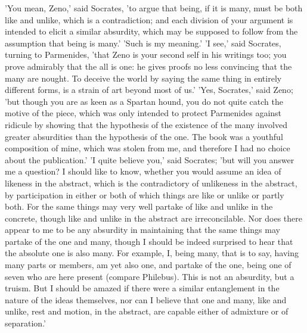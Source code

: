 'You mean, Zeno,' said Socrates, 'to argue that being, if it is many,
must be both like and unlike, which is a contradiction; and each
division of your argument is intended to elicit a similar absurdity,
which may be supposed to follow from the assumption that being is many.'
'Such is my meaning.' 'I see,' said Socrates, turning to Parmenides,
'that Zeno is your second self in his writings too; you prove admirably
that the all is one: he gives proofs no less convincing that the many
are nought. To deceive the world by saying the same thing in entirely
different forms, is a strain of art beyond most of us.' 'Yes, Socrates,'
said Zeno; 'but though you are as keen as a Spartan hound, you do not
quite catch the motive of the piece, which was only intended to protect
Parmenides against ridicule by showing that the hypothesis of the
existence of the many involved greater absurdities than the hypothesis
of the one. The book was a youthful composition of mine, which was
stolen from me, and therefore I had no choice about the publication.' 'I
quite believe you,' said Socrates; 'but will you answer me a question? I
should like to know, whether you would assume an idea of likeness in the
abstract, which is the contradictory of unlikeness in the abstract, by
participation in either or both of which things are like or unlike
or partly both. For the same things may very well partake of like and
unlike in the concrete, though like and unlike in the abstract are
irreconcilable. Nor does there appear to me to be any absurdity in
maintaining that the same things may partake of the one and many, though
I should be indeed surprised to hear that the absolute one is also
many. For example, I, being many, that is to say, having many parts or
members, am yet also one, and partake of the one, being one of seven
who are here present (compare Philebus). This is not an absurdity, but
a truism. But I should be amazed if there were a similar entanglement in
the nature of the ideas themselves, nor can I believe that one and many,
like and unlike, rest and motion, in the abstract, are capable either of
admixture or of separation.'

